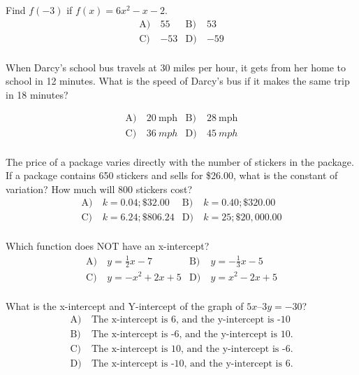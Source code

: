 \begin{problem}\label{Alg25}
Find $f(-3)$ if $f(x)=6x^2-x-2$.
\begin{align*}
\text{A)}\ & 55 &
\text{B)}\ & 53\\
\text{C)}\ &  -53 &
\text{D)}\ & -59\\
\end{align*} 
\end{problem}



\begin{problem}\label{Alg26}
  When Darcy’s school bus travels at 30 miles per hour, it gets from her home to school in 12 minutes. What is the speed of Darcy’s bus if it makes the same trip in 
	18 minutes?

\begin{align*}
\text{A)}\ & 20 \  \text{mph} &
\text{B)}\ & 28 \ \text{mph}\\
\text{C)}\ &  36 \  mph &
\text{D)}\ & 45\  mph\\
\end{align*} 
\end{problem}



\begin{problem}\label{Alg27}
The price of a package varies directly with the number of stickers in the package.   If a package contains 650 stickers and sells for \$26.00, what is the constant of variation? How much will 800 stickers cost?
\begin{align*}
\text{A)}\ & k = 0.04; \$32.00 &
\text{B)}\ &		k = 0.40; \$320.00
\\
\text{C)}\ &  		k = 6.24; \$806.24
 &
\text{D)}\ &		k = 25; \$20,000.00 
\\
\end{align*} 
\end{problem}


\begin{problem}\label{Alg28}
Which function does NOT have an x-intercept?
\begin{align*}
\text{A)}\ &y=\frac{1}{2}x-7&
\text{B)}\ & y=-\frac{1}{3}x-5\\
\text{C)}\ &  y=-x^2+2x+5 &
\text{D)}\ & y=x^2-2x+5\\
\end{align*} 
\end{problem}



\begin{problem}\label{Alg31}
What is the x-intercept and Y-intercept of the graph of  $5x – 3y = -30$?
\begin{align*}
\text{A)}\ &\text{The x-intercept is 6, and the y-intercept is -10}\\
\text{B)}\ &\text{The x-intercept is -6, and the y-intercept is 10}.
\\
\text{C)}\ &\text{The x-intercept is 10, and the y-intercept is -6}.
\\
\text{D)}\ & \text{The x-intercept is -10, and the y-intercept is 6}.
\\
\end{align*} 
\end{problem}


